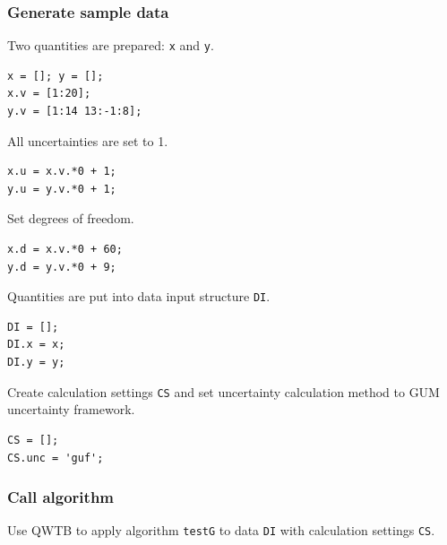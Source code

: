 \startcontents[localtoc]



{}
\subsubsection*{Generate sample data}



Two quantities are prepared: \texttt{x} and \texttt{y}.

\begin{lstlisting}
x = []; y = [];
x.v = [1:20];
y.v = [1:14 13:-1:8];
\end{lstlisting}


All uncertainties are set to 1.

\begin{lstlisting}
x.u = x.v.*0 + 1;
y.u = y.v.*0 + 1;
\end{lstlisting}


Set degrees of freedom.

\begin{lstlisting}
x.d = x.v.*0 + 60;
y.d = y.v.*0 + 9;
\end{lstlisting}


Quantities are put into data input structure \texttt{DI}.

\begin{lstlisting}
DI = [];
DI.x = x;
DI.y = y;
\end{lstlisting}


Create calculation settings \texttt{CS} and set uncertainty calculation method to GUM uncertainty
framework.

\begin{lstlisting}
CS = [];
CS.unc = 'guf';
\end{lstlisting}


{}
\subsubsection*{Call algorithm}



Use QWTB to apply algorithm \texttt{testG} to data \texttt{DI} with calculation settings \texttt{CS}.

